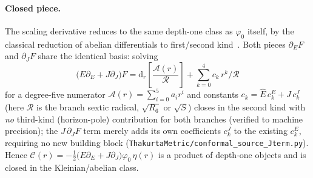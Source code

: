 \documentclass[12pt]{iopart}
\newcommand{\Ehat}{\hat E}
\newcommand{\dd}{\mathrm{d}}
\begin{document}
\paragraph{Closed piece.} The scaling derivative reduces to the same depth-one
class as $\varphi_0$ itself, by the classical reduction of abelian differentials to
first/second kind~\cite{BakerAbelian1897,GriffithsHarris1978}. Both pieces
$\partial_E F$ and $\partial_J F$ share the identical basis: solving
\begin{equation}
    \big(E\partial_E+J\partial_J\big)F=\dd_r\!\left[\frac{\mathcal{A}(r)}{\mathcal{R}}\right]
    +\sum_{k=0}^{4}c_k\,r^k/\mathcal{R}
    \label{eq:dEphi0}
\end{equation}
for a degree-five numerator $\mathcal{A}(r)=\sum_{i=0}^{5}a_i r^i$ and constants
$c_k=\Ehat\,c_k^{E}+J\,c_k^{J}$ (here $\mathcal{R}$ is the branch sextic radical,
$\sqrt{R_6}$ or $\sqrt{S}$) closes in the second kind with \emph{no} third-kind
(horizon-pole) contribution for both branches (verified to machine precision); the
$J\,\partial_J F$ term merely adds its own coefficients $c_k^{J}$ to the existing
$c_k^{E}$, requiring no new building block
(\texttt{ThakurtaMetric/conformal\_source\_Jterm.py}). Hence
$\mathcal{C}(r)=-\tfrac12\big(E\partial_E+J\partial_J\big)\varphi_0\,\eta(r)$ is
a product of depth-one objects and is closed in the Kleinian/abelian class.
\end{document}
